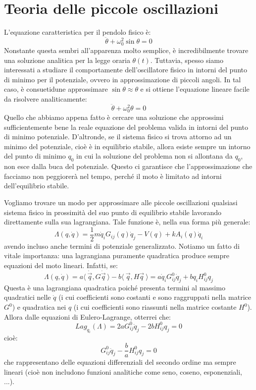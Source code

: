 \documentclass[a4paper,openany]{article}
\begin{document}
	\newpage
	\section{Teoria delle piccole oscillazioni}
	L'equazione caratteristica per il pendolo fisico è:
	$$
	\ddot{\theta} + \omega^2_0 \sin\theta = 0
	$$
	Nonstante questa sembri all'apparenza molto semplice, è incredibilmente trovare una soluzione analitica per la legge oraria $\theta(t)$. Tuttavia, spesso siamo interessati a studiare il comportamente dell'oscillatore fisico in intorni del punto di minimo per il potenziale, ovvero in approssimazione di piccoli angoli. In tal caso, è consuetidune approssimare $\sin\theta \approx \theta$ e si ottiene l'equazione lineare facile da risolvere analiticamente:
	$$
	\ddot{\theta} + \omega^2_0 \theta = 0
	$$
	Quello che abbiamo appena fatto è cercare una soluzione che approssimi sufficientemente bene la reale equazione del problema valida in intorni del punto di minimo potenziale. D'altronde, se il sistema fisico si trova attorno ad un minimo del potenziale, cioè è in equilibrio stabile, allora esiste sempre un intorno del punto di minimo $q_0$ in cui la soluzione del problema non si allontana da $q_0$, non esce dalla buca del potenziale. Questo ci garantisce che l'approssimazione che facciamo non peggiorerà nel tempo, perché il moto è limitato ad intorni dell'equilibrio stabile.
	
	Vogliamo trovare un modo per approssimare alle piccole oscillazioni qualsiasi sistema fisico in prossimità del suo punto di equilibrio stabile lavorando direttamente sulla sua lagrangiana. Tale funzione è, nella sua forma più generale:
	\begin{equation}\label{key}
		\Lambda(q,\dot{q}) = \dfrac{1}{2}m\dot{q}_iG_{ij}(q)\dot{q}_j - V(q) + k A_i(q)\dot{q}_i
	\end{equation}
	avendo incluso anche termini di potenziale generalizzato. Notiamo un fatto di vitale importanza: una lagrangiana puramente quadratica produce sempre equazioni del moto lineari. Infatti, se:
	\begin{equation}\label{key}
		\Lambda(q,\dot{q}) = a\langle \>\dot{\vec{q}},G\dot{\vec{q}} \>\rangle  - b\langle \>\vec{q},H\vec{q} \>\rangle = a \dot{q}_iG_{ij}^{0}\dot{q}_j + bq_iH_{ij}^{0}q_j
	\end{equation}
	Questa è una lagrangiana quadratica poiché presenta termini al massimo quadratici nelle $\dot{q}$ (i cui coefficienti sono costanti e sono raggruppati nella matrice $G^{0}$) e quadratica nei $q$ (i cui coefficienti sono riassunti nella matrice costante $H^{0}$). Allora dalle equazioni di Eulero-Lagrange, otterrei che:
	\begin{equation}\label{key}
		Lag_{q_i}(\Lambda) = 2aG_{ij}^{0}\ddot{q}_j - 2bH_{ij}^{0}q_j = 0
	\end{equation}
	cioè:
	\begin{equation}\label{key}
		G_{ij}^{0}\ddot{q}_j - \dfrac{b}{a}H_{ij}^{0}q_j = 0
	\end{equation}
	che rappresentano delle equazioni differenziali del secondo ordine ma sempre lineari (cioè non includono funzioni analitiche come seno, coseno, esponenziali, ...).
	
\end{document}
